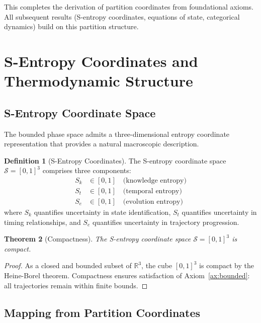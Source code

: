\documentclass[11pt,twocolumn,a4paper]{article}
\newtheorem{theorem}{Theorem}[section]
\theoremstyle{definition}
\newtheorem{definition}[theorem]{Definition}
\theoremstyle{remark}
\newcommand{\RR}{\mathbb{R}}
\newcommand{\Sspace}{\mathcal{S}}
\newcommand{\Sk}{S_k}
\newcommand{\St}{S_t}
\newcommand{\Se}{S_e}
\begin{document}
This completes the derivation of partition coordinates from foundational axioms. All subsequent results (S-entropy coordinates, equations of state, categorical dynamics) build on this partition structure.

\section{S-Entropy Coordinates and Thermodynamic Structure}
\label{sec:st_stellas}

\subsection{S-Entropy Coordinate Space}

The bounded phase space admits a three-dimensional entropy coordinate representation that provides a natural macroscopic description.

\begin{definition}[S-Entropy Coordinates]
\label{def:s_entropy}
The S-entropy coordinate space $\Sspace = [0,1]^3$ comprises three components:
\begin{align}
\Sk &\in [0,1] \quad \text{(knowledge entropy)} \label{eq:Sk} \\
\St &\in [0,1] \quad \text{(temporal entropy)} \label{eq:St} \\
\Se &\in [0,1] \quad \text{(evolution entropy)} \label{eq:Se}
\end{align}
where $\Sk$ quantifies uncertainty in state identification, $\St$ quantifies uncertainty in timing relationships, and $\Se$ quantifies uncertainty in trajectory progression.
\end{definition}

\begin{theorem}[Compactness]
\label{thm:s_entropy_compact}
The S-entropy coordinate space $\Sspace = [0,1]^3$ is compact.
\end{theorem}

\begin{proof}
As a closed and bounded subset of $\RR^3$, the cube $[0,1]^3$ is compact by the Heine-Borel theorem. Compactness ensures satisfaction of Axiom~\ref{ax:bounded}: all trajectories remain within finite bounds.
\end{proof}



\subsection{Mapping from Partition Coordinates}
\end{document}
